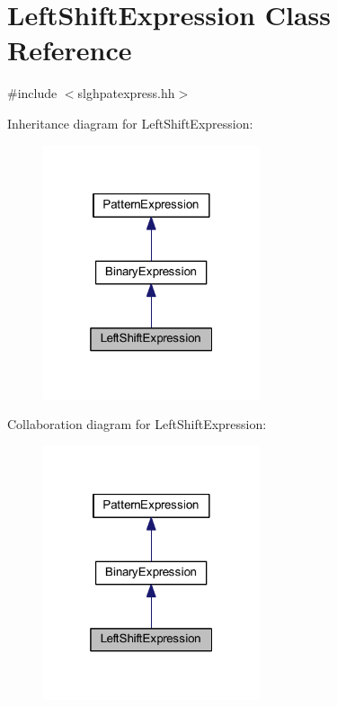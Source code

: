 \hypertarget{class_left_shift_expression}{}\section{Left\+Shift\+Expression Class Reference}
\label{class_left_shift_expression}


{\ttfamily \#include $<$slghpatexpress.\+hh$>$}



Inheritance diagram for Left\+Shift\+Expression\+:
\nopagebreak
\begin{figure}[H]
\begin{center}
\leavevmode
\includegraphics[width=181pt]{class_left_shift_expression__inherit__graph}
\end{center}
\end{figure}


Collaboration diagram for Left\+Shift\+Expression\+:
\nopagebreak
\begin{figure}[H]
\begin{center}
\leavevmode
\includegraphics[width=181pt]{class_left_shift_expression__coll__graph}
\end{center}
\end{figure}
